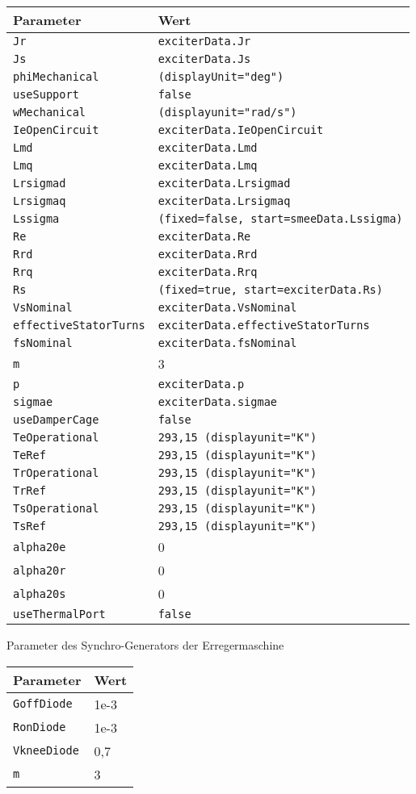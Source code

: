 \begin{longtable}[]{@{}ll@{}}
\toprule
Parameter & Wert\tabularnewline
\midrule
\endhead
\texttt{Jr} & \texttt{exciterData.Jr}\tabularnewline
\texttt{Js} & \texttt{exciterData.Js}\tabularnewline
\texttt{phiMechanical} & \texttt{(displayUnit="deg")}\tabularnewline
\texttt{useSupport} & \texttt{false}\tabularnewline
\texttt{wMechanical} & \texttt{(displayunit="rad/s")}\tabularnewline
\texttt{IeOpenCircuit} &
\texttt{exciterData.IeOpenCircuit}\tabularnewline
\texttt{Lmd} & \texttt{exciterData.Lmd}\tabularnewline
\texttt{Lmq} & \texttt{exciterData.Lmq}\tabularnewline
\texttt{Lrsigmad} & \texttt{exciterData.Lrsigmad}\tabularnewline
\texttt{Lrsigmaq} & \texttt{exciterData.Lrsigmaq}\tabularnewline
\texttt{Lssigma} &
\texttt{(fixed=false,\ start=smeeData.Lssigma)}\tabularnewline
\texttt{Re} & \texttt{exciterData.Re}\tabularnewline
\texttt{Rrd} & \texttt{exciterData.Rrd}\tabularnewline
\texttt{Rrq} & \texttt{exciterData.Rrq}\tabularnewline
\texttt{Rs} &
\texttt{(fixed=true,\ start=exciterData.Rs)}\tabularnewline
\texttt{VsNominal} & \texttt{exciterData.VsNominal}\tabularnewline
\texttt{effectiveStatorTurns} &
\texttt{exciterData.effectiveStatorTurns}\tabularnewline
\texttt{fsNominal} & \texttt{exciterData.fsNominal}\tabularnewline
\texttt{m} & 3\tabularnewline
\texttt{p} & \texttt{exciterData.p}\tabularnewline
\texttt{sigmae} & \texttt{exciterData.sigmae}\tabularnewline
\texttt{useDamperCage} & \texttt{false}\tabularnewline
\texttt{TeOperational} &
\texttt{293,15\ (displayunit="K")}\tabularnewline
\texttt{TeRef} & \texttt{293,15\ (displayunit="K")}\tabularnewline
\texttt{TrOperational} &
\texttt{293,15\ (displayunit="K")}\tabularnewline
\texttt{TrRef} & \texttt{293,15\ (displayunit="K")}\tabularnewline
\texttt{TsOperational} &
\texttt{293,15\ (displayunit="K")}\tabularnewline
\texttt{TsRef} & \texttt{293,15\ (displayunit="K")}\tabularnewline
\texttt{alpha20e} & 0\tabularnewline
\texttt{alpha20r} & 0\tabularnewline
\texttt{alpha20s} & 0\tabularnewline
\texttt{useThermalPort} & \texttt{false}\tabularnewline
\bottomrule
\end{longtable}

Parameter des Synchro-Generators der Erregermaschine

\begin{longtable}[]{@{}ll@{}}
\toprule
Parameter & Wert\tabularnewline
\midrule
\endhead
\texttt{GoffDiode} & 1e-3\tabularnewline
\texttt{RonDiode} & 1e-3\tabularnewline
\texttt{VkneeDiode} & 0,7\tabularnewline
\texttt{m} & 3\tabularnewline
\bottomrule
\end{longtable}

